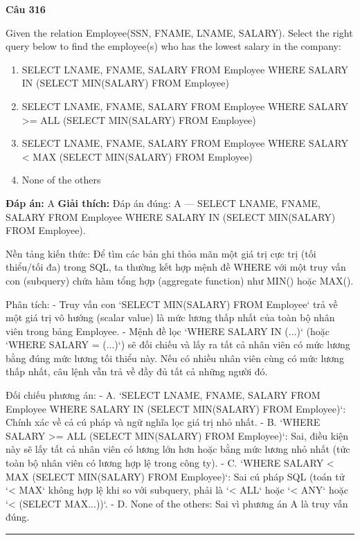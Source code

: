 \documentclass[11pt,a4paper]{article}
\newenvironment{question}[1]{%
  \par\vspace{1em}\noindent\textbf{\large Câu #1}\par\vspace{0.4em}
}{%
  \par\vspace{1em}\hrule\vspace{0.6em}
}
\newenvironment{choices}{%
  \begin{enumerate}[label=\textbf{\Alph*.},leftmargin=2.2em,itemsep=2pt,topsep=3pt]
}{%
  \end{enumerate}
}
\newcommand{\choice}{\item}
\begin{document}
\begin{question}{316}
Given the relation Employee(SSN, FNAME, LNAME, SALARY). Select the right query below to find the employee(s) who has the lowest salary in the company:
\begin{choices}
\choice SELECT LNAME, FNAME, SALARY FROM Employee WHERE SALARY IN (SELECT MIN(SALARY) FROM Employee)
\choice SELECT LNAME, FNAME, SALARY FROM Employee WHERE SALARY >= ALL (SELECT MIN(SALARY) FROM Employee)
\choice SELECT LNAME, FNAME, SALARY FROM Employee WHERE SALARY < MAX (SELECT MIN(SALARY) FROM Employee)
\choice None of the others
\end{choices}
\textbf{Đáp án:} A
\textbf{Giải thích:} Đáp án đúng: A — SELECT LNAME, FNAME, SALARY FROM Employee WHERE SALARY IN (SELECT MIN(SALARY) FROM Employee).

Nền tảng kiến thức: Để tìm các bản ghi thỏa mãn một giá trị cực trị (tối thiểu/tối đa) trong SQL, ta thường kết hợp mệnh đề WHERE với một truy vấn con (subquery) chứa hàm tổng hợp (aggregate function) như MIN() hoặc MAX().

Phân tích:
- Truy vấn con `SELECT MIN(SALARY) FROM Employee` trả về một giá trị vô hướng (scalar value) là mức lương thấp nhất của toàn bộ nhân viên trong bảng Employee.
- Mệnh đề lọc `WHERE SALARY IN (...)` (hoặc `WHERE SALARY = (...)`) sẽ đối chiếu và lấy ra tất cả nhân viên có mức lương bằng đúng mức lương tối thiểu này. Nếu có nhiều nhân viên cùng có mức lương thấp nhất, câu lệnh vẫn trả về đầy đủ tất cả những người đó.

Đối chiếu phương án:
- A. `SELECT LNAME, FNAME, SALARY FROM Employee WHERE SALARY IN (SELECT MIN(SALARY) FROM Employee)`: Chính xác về cả cú pháp và ngữ nghĩa lọc giá trị nhỏ nhất.
- B. `WHERE SALARY >= ALL (SELECT MIN(SALARY) FROM Employee)`: Sai, điều kiện này sẽ lấy tất cả nhân viên có lương lớn hơn hoặc bằng mức lương nhỏ nhất (tức toàn bộ nhân viên có lương hợp lệ trong công ty).
- C. `WHERE SALARY < MAX (SELECT MIN(SALARY) FROM Employee)`: Sai cú pháp SQL (toán tử `< MAX` không hợp lệ khi so với subquery, phải là `< ALL` hoặc `< ANY` hoặc `< (SELECT MAX...))`.
- D. None of the others: Sai vì phương án A là truy vấn đúng.
\end{question}
\end{document}
